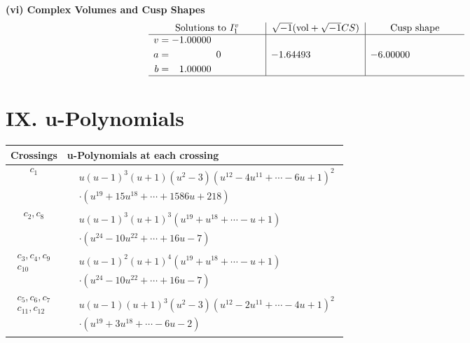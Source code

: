 \documentclass[1p]{elsarticle_modified}
\theoremstyle{definition}
\newcommand{\I}{\sqrt{-1}}
\begin{document}
\newpage\flushleft \textbf{(vi) Complex Volumes and Cusp Shapes}
$$\begin{array}{c|c|c}  
\text{Solutions to }I^v_{1}& \I (\text{vol} + \sqrt{-1}CS) & \text{Cusp shape}\\
 \hline 
\begin{aligned}
v &= -1.00000\phantom{ +0.000000I} \\
a &= \phantom{-0.000000 } 0 \\
b &= \phantom{-}1.00000\phantom{ +0.000000I}\end{aligned}
 & -1.64493\phantom{ +0.000000I} & -6.00000\phantom{ +0.000000I}\\
 \hline 
 \end{array}$$\newpage
\newpage\renewcommand{\arraystretch}{1}
\centering \section*{ IX. u-Polynomials}
\begin{tabular}{m{50pt}|m{274pt}}
Crossings & \hspace{64pt}u-Polynomials at each crossing \\
\hline $$\begin{aligned}c_{1}\end{aligned}$$&$\begin{aligned}
&u(u-1)^3(u+1)(u^2-3)(u^{12}-4 u^{11}+\cdots-6 u+1)^{2}\\
&\cdot(u^{19}+15 u^{18}+\cdots+1586 u+218)
\end{aligned}$\\
\hline $$\begin{aligned}c_{2},c_{8}\end{aligned}$$&$\begin{aligned}
&u(u-1)^3(u+1)^3(u^{19}+u^{18}+\cdots- u+1)\\
&\cdot(u^{24}-10 u^{22}+\cdots+16 u-7)
\end{aligned}$\\
\hline $$\begin{aligned}c_{3},c_{4},c_{9}\\c_{10}\end{aligned}$$&$\begin{aligned}
&u(u-1)^2(u+1)^4(u^{19}+u^{18}+\cdots- u+1)\\
&\cdot(u^{24}-10 u^{22}+\cdots+16 u-7)
\end{aligned}$\\
\hline $$\begin{aligned}c_{5},c_{6},c_{7}\\c_{11},c_{12}\end{aligned}$$&$\begin{aligned}
&u(u-1)(u+1)^3(u^2-3)(u^{12}-2 u^{11}+\cdots-4 u+1)^{2}\\
&\cdot(u^{19}+3 u^{18}+\cdots-6 u-2)
\end{aligned}$\\
\hline
\end{tabular}\newpage\renewcommand{\arraystretch}{1}
\end{document}

